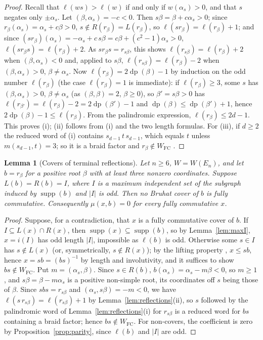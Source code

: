 \documentclass[10pt]{article}
\newtheorem{lemma}[theorem]{Lemma}
\theoremstyle{remark}
\newcommand{\FC}{W_{\mathrm{FC}}}
\newcommand{\supp}{\operatorname{supp}}
\newcommand{\dpth}{\operatorname{dp}}
\begin{document}
\begin{proof}
Recall that $\ell(ws)>\ell(w)$ if and only if $w(\alpha_s)>0$, and that
$s$ negates only $\pm\alpha_s$. Let $(\beta,\alpha_s)=-c<0$. Then
$s\beta=\beta+c\alpha_s>0$; since $r_\beta(\alpha_s)=\alpha_s+c\beta>0$,
$s\notin R(r_\beta)=L(r_\beta)$, so $\ell(sr_\beta)=\ell(r_\beta)+1$; and
since $(sr_\beta)(\alpha_s)=-\alpha_s+c\,s\beta=c\beta+(c^2-1)\alpha_s>0$,
$\ell(sr_\beta s)=\ell(r_\beta)+2$. As $sr_\beta s=r_{s\beta}$, this shows
$\ell(r_{s\beta})=\ell(r_\beta)+2$ when $(\beta,\alpha_s)<0$ and, applied
to $s\beta$, $\ell(r_{s\beta})=\ell(r_\beta)-2$ when $(\beta,\alpha_s)>0$,
$\beta\neq\alpha_s$. Now $\ell(r_\beta)=2\dpth(\beta)-1$ by induction on
the odd number $\ell(r_\beta)$ (the case $\ell(r_\beta)=1$ is immediate): if
$\ell(r_\beta)\geq3$, some $s$ has
$(\beta,\alpha_s)>0$, $\beta\neq\alpha_s$ (as $(\beta,\beta)=2$,
$\beta\geq0$), so $\beta'=s\beta>0$ has
$\ell(r_{\beta'})=\ell(r_\beta)-2=2\dpth(\beta')-1$ and
$\dpth(\beta)\leq\dpth(\beta')+1$, hence $2\dpth(\beta)-1\leq\ell(r_\beta)$.
From the palindromic expression, $\ell(r_\beta)\leq2d-1$. This proves (i);
(ii) follows from (i) and the two length formulas. For (iii), if $d\geq2$
the reduced word of (i) contains $s_{d-1}\,t\,s_{d-1}$, which equals $t$
unless $m(s_{d-1},t)=3$; so it is a braid factor and $r_\beta\notin\FC$
\cite[Proposition~2.1]{Stembridge}.
\end{proof}

\begin{lemma}[Covers of terminal reflections]\label{lem:covers}
Let $n\geq6$, $W=W(E_n)$, and let $b=r_\beta$ for a positive root $\beta$
with at least three nonzero coordinates. Suppose $L(b)=R(b)=I$, where $I$
is a maximum independent set of the subgraph induced by $\supp(b)$ and
$|I|$ is odd. Then no Bruhat cover of $b$ is fully commutative.
Consequently $\mu(x,b)=0$ for every fully commutative $x$.
\end{lemma}
\begin{proof}
Suppose, for a contradiction, that $x$ is a fully commutative cover of $b$.
If $I\subseteq L(x)\cap R(x)$, then
$\supp(x)\subseteq\supp(b)$, so by Lemma~\ref{lem:maxI},
$x=i(I)$ has odd length $|I|$, impossible as $\ell(b)$ is odd. Otherwise
some $s\in I$ has $s\notin L(x)$ (or, symmetrically, $s\notin R(x)$); by the
lifting property \cite[Proposition~2.2.7]{BB}, $x\leq sb$, hence
$x=sb=(bs)^{-1}$ by length and involutivity, and it suffices to show
$bs\notin\FC$. Put
$m=(\alpha_s,\beta)$. Since $s\in R(b)$, $b(\alpha_s)=\alpha_s-m\beta<0$,
so $m\geq1$, and $s\beta=\beta-m\alpha_s$ is a positive non-simple root,
its coordinates off $s$ being those of $\beta$. Since $sbs=r_{s\beta}$ and
$(\alpha_s,s\beta)=-m<0$, we have
$\ell(s\,r_{s\beta})=\ell(r_{s\beta})+1$ by
Lemma~\ref{lem:reflections}(ii), so $s$ followed by the
palindromic word of Lemma~\ref{lem:reflections}(i) for $r_{s\beta}$ is a
reduced word for $bs$ containing a braid factor; hence $bs\notin\FC$.
For non-covers, the coefficient is zero by Proposition~\ref{prop:parity},
since $\ell(b)$ and $|I|$ are odd.
\end{proof}
\end{document}
